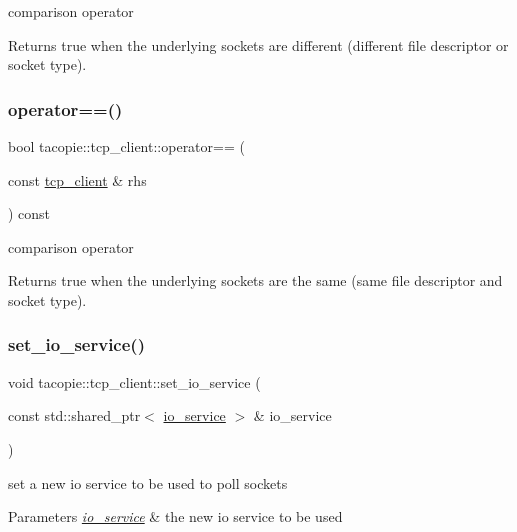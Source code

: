 comparison operator

\begin{DoxyReturn}{Returns}
true when the underlying sockets are different (different file descriptor or socket type). 
\end{DoxyReturn}
\mbox{\label{classtacopie_1_1tcp__client_af7a1796c04efd00542349ecab692e073}} 
\subsubsection{\texorpdfstring{operator==()}{operator==()}}
{\footnotesize\ttfamily bool tacopie\+::tcp\+\_\+client\+::operator== (\begin{DoxyParamCaption}\item[{const \hyperlink{classtacopie_1_1tcp__client}{tcp\+\_\+client} \&}]{rhs }\end{DoxyParamCaption}) const}

comparison operator

\begin{DoxyReturn}{Returns}
true when the underlying sockets are the same (same file descriptor and socket type). 
\end{DoxyReturn}
\mbox{\label{classtacopie_1_1tcp__client_a335bbe54644618210ab45f3425726e6f}} 
\subsubsection{\texorpdfstring{set\+\_\+io\+\_\+service()}{set\_io\_service()}}
{\footnotesize\ttfamily void tacopie\+::tcp\+\_\+client\+::set\+\_\+io\+\_\+service (\begin{DoxyParamCaption}\item[{const std\+::shared\+\_\+ptr$<$ \hyperlink{classtacopie_1_1io__service}{io\+\_\+service} $>$ \&}]{io\+\_\+service }\end{DoxyParamCaption})}

set a new io service to be used to poll sockets 
\begin{DoxyParams}{Parameters}
{\em \hyperlink{classtacopie_1_1io__service}{io\+\_\+service}} & the new io service to be used \\
\hline
\end{DoxyParams}
\mbox{\label{classtacopie_1_1tcp__client_a8c290d681186edb0578051c04f3c0762}} 
